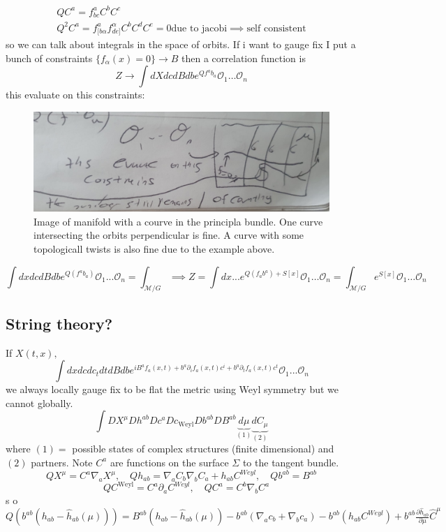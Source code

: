 \documentclass[10pt,
 article,
 amsmath,amssymb
]{revtex4-2}
\begin{document}
\begin{align}
    QC^a=f_{bc}^a C^b C^c \\
    Q^2 C^a = f^a_{[b \alpha} f^{\alpha}_{de]}C^bC^d C^e =0 \text{due to jacobi} \implies \text{self consistent}
\end{align}
so we can talk about integrals in the space of orbits. If i want to gauge fix I put a bunch of constraints 
$  \{f_\alpha(x)=0\}\to B$ then a correlation function is 
$$Z \to \int dX dc dB db e^{Qf^ab_a} \mathcal{O}_1 \dots \mathcal{O}_n$$ 
this evaluate on this constraints:
\begin{figure}
    \begin{center}
        \includegraphics[scale=0.2]{sections1}
   \caption{Image of manifold with a courve in the principla bundle. One curve intersecting the orbits perpendicular is fine. 
   A curve with some topologicall twists is also fine due to the example above.}    
    \end{center}
   
\end{figure}

\begin{equation}
    \int dx dc dB db e^{Q(f^a b_a)}  \mathcal{O}_1 ... \mathcal{O}_n = \int_{\mathcal{M}/G} \implies Z= \int dx ... e^{Q(f_a b^a)+ S[x]}  \mathcal{O}_1\dots  \mathcal{O}_n = \int_{\mathcal{M}/G} e^{S[x]}  \mathcal{O}_1\dots  \mathcal{O}_n
\end{equation}
\subsection{String theory?}
If $X(t,x),$ 
\begin{equation}
    \int dx dc dc_t dt dB db e^{iB^a f_a(x,t)+ b^a \partial_i f_a(x,t) c^i +b^a \partial_t f_a(x,t) c^t} \mathcal{O}_1 ... \mathcal{O}_n 
\end{equation}
we always locally gauge fix to be flat the metric using Weyl symmetry but we cannot globally. 
\begin{equation}
    \int D X^\mu D h^{ab} D c^a D c_{\text{Weyl}} Db^{ab} DB^{ab} \underbrace{d \mu}_{(1)} \underbrace{dC_\mu}_{(2)}
\end{equation}
where $(1)=$ possible states of complex structures (finite dimensional) and $(2)$ partners. Note $C^a$ are functions on the surface $\Sigma$ to the tangent bundle.
$$QX^\mu =C^a \nabla_a X^\mu,\quad Q h_{ab}= \nabla_a C_b \nabla_b C_a +h_{ab} C^{Weyl}, \quad Q b^{ab}=B^{ab}$$
$$\quad QC^{\text{Weyl}}=C^a \partial_a C^{Weyl}, \quad QC^a =C^b \nabla_b C^a$$
s
o $Q(b^{ab}(h_{ab}-\hat{h}_{ab}(\mu)))=B^{ab}(h_{ab}-\hat{h}_{ab}(\mu))-b^{ab}(\nabla_a c_b +\nabla_b c_a)-b^{ab}(h_{ab}C^{Weyl}) +b^{ab} \frac{\partial \hat{h}_{ab}}{\partial \mu} \hat{C}^\mu$
\end{document}
